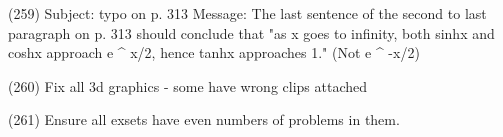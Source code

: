 {(259) Subject: typo on p. 313
Message: The last sentence of the second to last paragraph on p. 313 should conclude that "as x goes to infinity, both sinhx and coshx approach e ^ x/2, hence tanhx approaches 1." (Not e ^ -x/2)

(260) Fix all 3d graphics - some have wrong clips attached

(261) Ensure all exsets have even numbers of problems in them.





}
